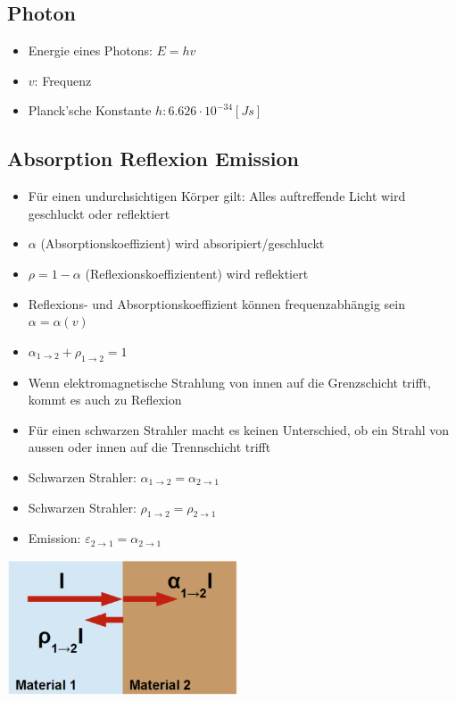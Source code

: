 \documentclass[8pt,a4paper]{scrartcl}
\begin{document}
\begin{multicols*}{3}
					\subsection{Photon}
						\begin{itemize}\itemsep0pt
							\item Energie eines Photons: $E = hv$
							\item $v$: Frequenz
							\item Planck'sche Konstante $h: 6.626\cdot 10^{-34} [Js] $
						\end{itemize}						
					
					\subsection{Absorption Reflexion Emission}
						\begin{itemize}\itemsep0pt
							\item Für einen undurchsichtigen Körper gilt: Alles auftreffende Licht wird geschluckt oder reflektiert
							\item $\alpha$ (Absorptionskoeffizient) wird absoripiert/geschluckt
							\item $\rho = 1 - \alpha$ (Reflexionskoeffizientent) wird reflektiert
							\item Reflexions- und Absorptionskoeffizient können frequenzabhängig sein $\alpha = \alpha(v)$ 
							
							\item $ \alpha_{1\rightarrow 2} + \rho_{1\rightarrow 2} = 1$
							\item Wenn elektromagnetische Strahlung von innen auf die Grenzschicht trifft, kommt es auch zu Reflexion 
							\item Für einen schwarzen Strahler macht es keinen Unterschied, ob ein Strahl von aussen oder innen auf die Trennschicht trifft
							\item Schwarzen Strahler: $ \alpha_{1\rightarrow 2} = \alpha_{2\rightarrow 1} $
							\item Schwarzen Strahler: $ \rho_{1\rightarrow 2} = \rho_{2\rightarrow 1} $
							\item Emission: $ \varepsilon_{2\rightarrow 1} = \alpha_{2\rightarrow 1} $
						\end{itemize}		
						
						\includegraphics[height=4cm]{img/absopreflex.png} 
					

\end{multicols*}
\end{document}
